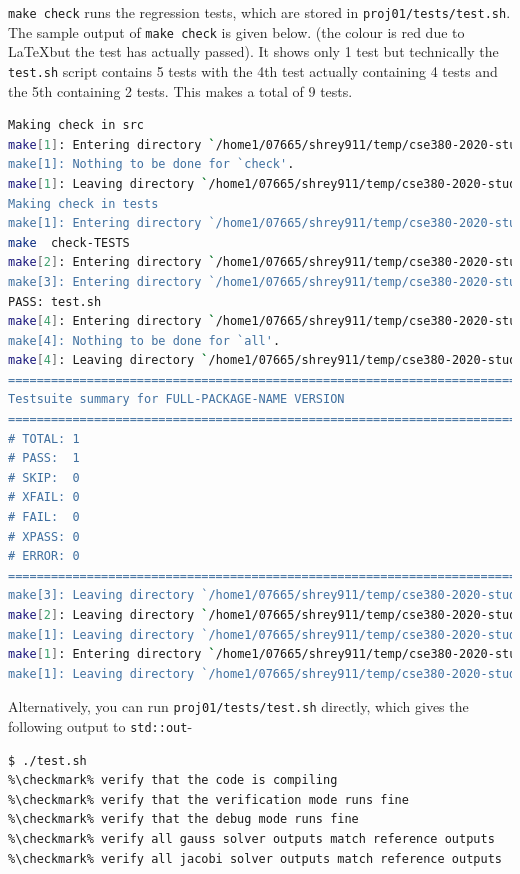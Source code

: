 \documentclass[12 pt, final]{article}
\def \checkmark{\tikz\fill[scale=0.4](0,.35) -- (.25,0) -- (1,.7) -- (.25,.15) -- cycle;}
\begin{document}
\begin{itemize}
\texttt{make check} runs the regression tests, which are stored in \texttt{proj01/tests/test.sh}. The sample output of \texttt{make check} is given below. (the colour is red due to \LaTeX but the test has actually passed). It shows only 1 test but technically the \texttt{test.sh} script contains 5 tests with the 4th test actually containing 4 tests and the 5th containing 2 tests. This makes a total of 9 tests.
\begin{lstlisting}[language=bash,basicstyle=\tiny]
Making check in src
make[1]: Entering directory `/home1/07665/shrey911/temp/cse380-2020-student-Shreyas911/proj01/src'
make[1]: Nothing to be done for `check'.
make[1]: Leaving directory `/home1/07665/shrey911/temp/cse380-2020-student-Shreyas911/proj01/src'
Making check in tests
make[1]: Entering directory `/home1/07665/shrey911/temp/cse380-2020-student-Shreyas911/proj01/tests'
make  check-TESTS
make[2]: Entering directory `/home1/07665/shrey911/temp/cse380-2020-student-Shreyas911/proj01/tests'
make[3]: Entering directory `/home1/07665/shrey911/temp/cse380-2020-student-Shreyas911/proj01/tests'
PASS: test.sh
make[4]: Entering directory `/home1/07665/shrey911/temp/cse380-2020-student-Shreyas911/proj01/tests'
make[4]: Nothing to be done for `all'.
make[4]: Leaving directory `/home1/07665/shrey911/temp/cse380-2020-student-Shreyas911/proj01/tests'
============================================================================
Testsuite summary for FULL-PACKAGE-NAME VERSION
============================================================================
# TOTAL: 1
# PASS:  1
# SKIP:  0
# XFAIL: 0
# FAIL:  0
# XPASS: 0
# ERROR: 0
============================================================================
make[3]: Leaving directory `/home1/07665/shrey911/temp/cse380-2020-student-Shreyas911/proj01/tests'
make[2]: Leaving directory `/home1/07665/shrey911/temp/cse380-2020-student-Shreyas911/proj01/tests'
make[1]: Leaving directory `/home1/07665/shrey911/temp/cse380-2020-student-Shreyas911/proj01/tests'
make[1]: Entering directory `/home1/07665/shrey911/temp/cse380-2020-student-Shreyas911/proj01'
make[1]: Leaving directory `/home1/07665/shrey911/temp/cse380-2020-student-Shreyas911/proj01'
\end{lstlisting}
Alternatively, you can run \texttt{proj01/tests/test.sh} directly, which gives the following output to \texttt{std::out}-


\begin{lstlisting}[language=bash,escapechar=\%]
$ ./test.sh 
%\checkmark% verify that the code is compiling
%\checkmark% verify that the verification mode runs fine
%\checkmark% verify that the debug mode runs fine
%\checkmark% verify all gauss solver outputs match reference outputs
%\checkmark% verify all jacobi solver outputs match reference outputs
\end{lstlisting}
\end{itemize}
\end{document}
